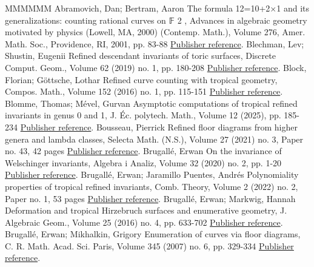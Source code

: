 \begin{thebibliography}{MMMMMM}
 Abramovich, Dan; Bertram, Aaron The formula 12=10+2×1 and its generalizations: counting rational curves on 𝔽 2 , Advances in algebraic geometry motivated by physics (Lowell, MA, 2000) (Contemp. Math.), Volume 276, Amer. Math. Soc., Providence, RI, 2001, pp. 83-88 \href{https://alco.centre-mersenne.org/articles/10.5802/alco.444/#abramovich-2001-formula}{Publisher reference}.
 Blechman, Lev; Shustin, Eugenii Refined descendant invariants of toric surfaces, Discrete Comput. Geom., Volume 62 (2019) no. 1, pp. 180-208 \href{https://alco.centre-mersenne.org/articles/10.5802/alco.444/#blechman-2019-refined}{Publisher reference}.
 Block, Florian; Göttsche, Lothar Refined curve counting with tropical geometry, Compos. Math., Volume 152 (2016) no. 1, pp. 115-151 \href{https://alco.centre-mersenne.org/articles/10.5802/alco.444/#block_refined_2016}{Publisher reference}.
 Blomme, Thomas; Mével, Gurvan Asymptotic computations of tropical refined invariants in genus 0 and 1, J. Éc. polytech. Math., Volume 12 (2025), pp. 185-234 \href{https://alco.centre-mersenne.org/articles/10.5802/alco.444/#blomme-2025-asymptotic}{Publisher reference}.
 Bousseau, Pierrick Refined floor diagrams from higher genera and lambda classes, Selecta Math. (N.S.), Volume 27 (2021) no. 3, Paper no. 43, 42 pages \href{https://alco.centre-mersenne.org/articles/10.5802/alco.444/#bousseau_refined_2021}{Publisher reference}.
 Brugallé, Erwan On the invariance of Welschinger invariants, Algebra i Analiz, Volume 32 (2020) no. 2, pp. 1-20 \href{https://alco.centre-mersenne.org/articles/10.5802/alco.444/#brugalle-2020-invariance}{Publisher reference}.
 Brugallé, Erwan; Jaramillo Puentes, Andrés Polynomiality properties of tropical refined invariants, Comb. Theory, Volume 2 (2022) no. 2, Paper no. 1, 53 pages \href{https://alco.centre-mersenne.org/articles/10.5802/alco.444/#brugalle_polynomiality_2022}{Publisher reference}.
 Brugallé, Erwan; Markwig, Hannah Deformation and tropical Hirzebruch surfaces and enumerative geometry, J. Algebraic Geom., Volume 25 (2016) no. 4, pp. 633-702 \href{https://alco.centre-mersenne.org/articles/10.5802/alco.444/#brugalle-2016-deformation}{Publisher reference}.
 Brugallé, Erwan; Mikhalkin, Grigory Enumeration of curves via floor diagrams, C. R. Math. Acad. Sci. Paris, Volume 345 (2007) no. 6, pp. 329-334 \href{https://alco.centre-mersenne.org/articles/10.5802/alco.444/#brugalle_enumeration_2007}{Publisher reference}.

\end{thebibliography}
